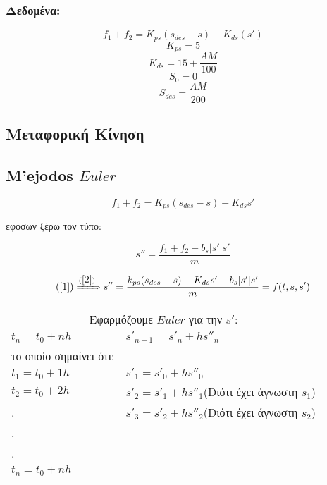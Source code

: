 \documentclass[a4paper]{article}
\begin{document}
        \subsubsection{Δεδομένα:}
            \[f_1 + f_2 = K_{ps} (s_{des} - s) - K_{ds}(s')\]
            \[K_{ps} = 5\]
            \[K_{ds} = 15 + \frac{AM}{100}\]
            \[S_0 =0\]
            \[S_{des} = \frac{AM}{200}\]

        \subsection{Μεταφορική Κίνηση}
        \subsection{M'ejodos $Euler$}
        \begin{equation}
            f_1+f_2=K_{ps}(s_{des}-s)-K_{ds}s'
            \label{2}
        \end{equation}

        εφόσων ξέρω τον τύπο:

        \begin{equation}
            s''=\frac{f_1+f_2-b_s\rvert s'\lvert s'}{m}
            \label{1}
        \end{equation}

        \[(\ref{1}) \xRightarrow{(\ref{2})}s''=\frac{k_{ps}(s_{des}-s)-K_{ds}s'-b_s\rvert s'\lvert s'}{m}=f(t,s,s')\]

        
        \begin{tabular}{l|l}
            \multicolumn{2}{c}{Εφαρμόζουμε $Euler$ για την $s'$: }\\
            $t_n=t_0+nh$ & $s'_{n+1}=s'_n+hs''_n$\\
            το οποίο σημαίνει ότι: & \\
            $t_1=t_0+1h$ & $s'_1=s'_0+hs''_0$\\
            $t_2=t_0+2h$ & $s'_2=s'_1+hs''_1$(Dιότι έχει άγνωστη $s_1$)\\
            .            & $s'_3=s'_2+hs''_2$(Dιότι έχει άγνωστη $s_2$)\\
            . & \\
            . & \\
            $t_n=t_0+nh$ & \\
        \end{tabular} 
        
\end{document}
